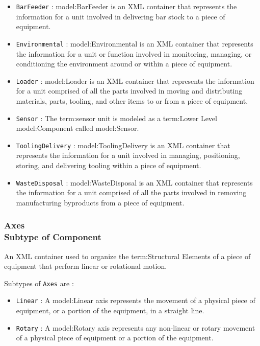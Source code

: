 \begin{itemize}

\item \texttt{BarFeeder} : {model:BarFeeder} is an XML container that represents the information for a unit involved in delivering bar stock to a piece of equipment.

\item \texttt{Environmental} : {model:Environmental} is an XML container that represents the information for a unit or function involved in monitoring, managing, or conditioning the environment around or within a piece of equipment.

\item \texttt{Loader} : {model:Loader} is an XML container that represents the information for a unit comprised of all the parts involved in moving and distributing materials, parts, tooling, and other items to or from a piece of equipment.

\item \texttt{Sensor} : The {term:sensor unit} is modeled as a {term:Lower Level} {model:Component} called {model:Sensor}.

\item \texttt{ToolingDelivery} : {model:ToolingDelivery} is an XML container that represents the information for a unit involved in managing, positioning, storing, and delivering tooling within a piece of equipment.


\item \texttt{WasteDisposal} : {model:WasteDisposal} is an XML container that represents the information for a unit comprised of all the parts involved in removing manufacturing byproducts from a piece of equipment.


\end{itemize}

\FloatBarrier
\subsubsection[Axes]{Axes \\ {\small Subtype of Component}}
  \label{type:Axes}

\FloatBarrier

An XML container used to organize the {term:Structural Elements} of a piece of equipment that perform linear or rotational motion.

Subtypes of \texttt{Axes} are : 

\begin{itemize}

\item \texttt{Linear} : A {model:Linear} axis represents the movement of a physical piece of equipment, or a portion of the equipment, in a straight line. 

\item \texttt{Rotary} : A {model:Rotary} axis represents any non-linear or rotary movement of a physical piece of equipment or a portion of the equipment.

\end{itemize}

